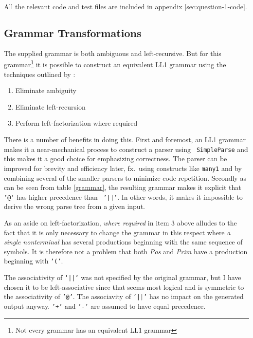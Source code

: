 \documentclass[
paper=a4,
oneside,
fontsize=11pt,
numbers=noenddot,
headinclude=false, %
footinclude=false, %
fleqn,             %
DIV=8
]{scrartcl}
\begin{document}
All the relevant code and test files are included in appendix
\ref{sec:question-1-code}.

\subsection{Grammar Transformations}

The supplied grammar is both ambiguous and left-recursive. But for this
grammar\footnote{Not every grammar has an equivalent \acs{LL1} grammar} it is
possible to construct an equivalent \acs{LL1} grammar using the techniques
outlined by \citet[p.~69]{mogensen2011}:
\begin{enumerate}
\item Eliminate ambiguity
\item Eliminate left-recursion
\item Perform left-factorization where required
\end{enumerate}
There is a number of benefits in doing this. First and foremost, an \acs{LL1}
grammar makes it a near-mechanical process to construct a parser using {\tt
  SimpleParse} and this makes it a good choice for emphasizing correctness. The
parser can be improved for brevity and efficiency later, fx.\ using constructs
like {\tt many1} and by combining several of the smaller parsers to minimize
code repetition. Secondly as can be seen from table \ref{grammar}, the resulting
grammar makes it explicit that {\tt '@'} has higher precedence than {\tt
  '||'}. In other words, it makes it impossible to derive the wrong parse tree
from a given input.

As an aside on left-factorization, {\em where required} in item 3 above alludes
to the fact that it is only necessary to change the grammar in this respect
where {\em a single nonterminal} has several productions beginning with the same
sequence of symbols. It is therefore not a problem that both {\em Pos} and {\em
  Prim} have a production beginning with {\tt '('}.

The associativity of {\tt '||'} was not specified by the original grammar, but I
have chosen it to be left-associative since that seems most logical and is
symmetric to the associativity of {\tt '@'}. The associavity of {\tt '||'} has
no impact on the generated output anyway. {\tt '+'} and {\tt '-'} are assumed to
have equal precedence.
\end{document}

